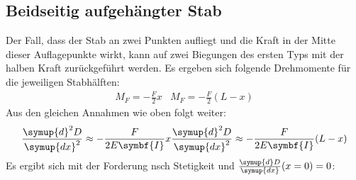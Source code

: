 \subsection{Beidseitig aufgehängter Stab}
Der Fall, dass der Stab an zwei Punkten aufliegt und die Kraft in der Mitte dieser
Auflagepunkte wirkt, kann auf zwei Biegungen des ersten Typs mit der halben Kraft zurückgeführt werden.
Es ergeben sich folgende Drehmomente für die jeweiligen Stabhälften:
\begin{align}
    M_F = -\frac{F}{2}x &
    M_F = -\frac{F}{2}(L-x)
\end{align}
Aus den gleichen Annahmen wie oben folgt weiter:
\begin{align}
    \frac{\symup{d}^2D}{\symup{dx}^2} \approx -\frac{F}{2E\symbf{I}} x
    \frac{\symup{d}^2D}{\symup{dx}^2} \approx -\frac{F}{2E\symbf{I}} (L-x)
\end{align}
Es ergibt sich mit der Forderung nsch Stetigkeit und \mbox{$\frac{\symup{d}D}{\symup{dx}}(x=0) = 0$}:
